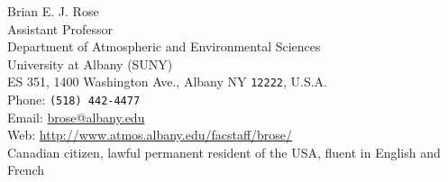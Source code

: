 \documentclass[11pt, letterpaper]{article} %
\begin{document}
\thispagestyle{empty}


{\LARGE Brian E. J. Rose}\\[0.3 cm] %
Assistant Professor \\
Department of Atmospheric and Environmental Sciences \\
University at Albany (SUNY) \\
ES 351, 1400 Washington Ave., Albany NY \texttt{12222}, U.S.A.\\[.2cm]
Phone: \texttt{(518) 442-4477}\\ %
Email: \href{mailto:brose@albany.edu}{brose@albany.edu}\\ %
Web: \href{http://www.atmos.albany.edu/facstaff/brose/}{http://www.atmos.albany.edu/facstaff/brose/}\\ %

Canadian citizen, lawful permanent resident of the USA, fluent in English and French








\end{document}
